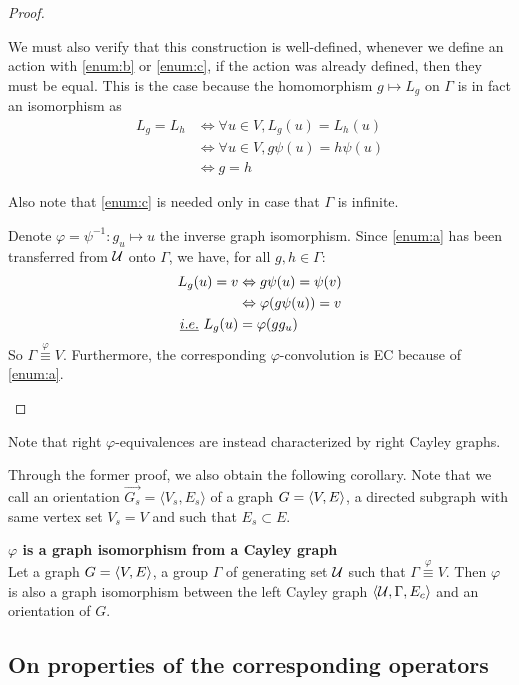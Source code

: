 \begin{proof}
\begin{enumerate}
We must also verify that this construction is well-defined, \ie whenever we define an action with \ref{enum:b} or \ref{enum:c}, if the action was already defined, then they must be equal. This is the case because the homomorphism $g \mapsto L_g$ on $\Gamma$ is in fact an isomorphism as
\begin{align*}
L_g = L_h & \Leftrightarrow \forall u \in V, L_g(u) = L_h(u)\\
 & \Leftrightarrow \forall u \in V, g\psi(u) = h\psi(u)\\
 & \Leftrightarrow g = h
\end{align*}

Also note that \ref{enum:c} is needed only in case that $\Gamma$ is infinite.

Denote $\varphi = \psi^{-1}: g_u \mapsto u$ the inverse graph isomorphism. Since \ref{enum:a} has been transferred from $\mathcal{U}$ onto $\Gamma$, we have, for all $g,h \in \Gamma$:
\begin{align*}
L_g(u) = v &\Leftrightarrow g\psi(u) = \psi(v)\\
           &\Leftrightarrow \varphi(g\psi(u)) = v\\
\emph{i.e.}~ L_g(u) &= \varphi(gg_u)
\end{align*}
So $\Gamma \overset\varphi\equiv V$. Furthermore, the corresponding $\varphi$-convolution is EC because of \ref{enum:a}.
\end{enumerate}
\end{proof}

\begin{remark}
Note that right $\varphi$-equivalences are instead characterized by right Cayley graphs.
\end{remark}

Through the former proof, we also obtain the following corollary. Note that we call an orientation $\vec{G_s} = \langle V_s, E_s \rangle$ of a graph $G = \langle V, E \rangle$, a directed subgraph with same vertex set $V_s = V$ and such that $E_s \subset E$.

\begin{corollary}\textbf{$\varphi$ is a graph isomorphism from a Cayley graph}\\
Let a graph $G = \langle V, E \rangle$, a group $\Gamma$ of generating set $\mathcal{U}$ such that $\Gamma \overset\varphi\equiv V$. Then $\varphi$ is also a graph isomorphism between the left Cayley graph $\langle \mathcal{U}, \Gamma, E_c \rangle$ and an orientation of $G$.
\label{cor:giso}
\end{corollary}

\subsection{On properties of the corresponding operators}
\label{sec:ec}

